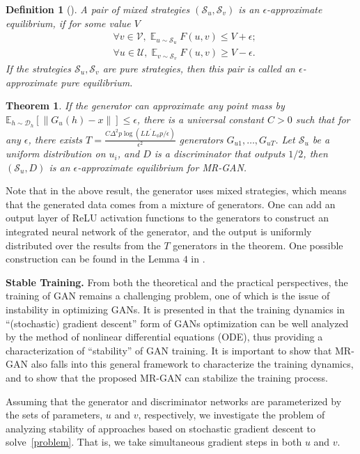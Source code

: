 \documentclass[10pt,twocolumn,letterpaper]{article}
\newcommand{\Eb}{\mathbb{E}}
\newcommand{\g}{{G_u}}
\newcommand{\U}{\mathcal{U}}
\newcommand{\D}{\mathcal{D}}
\newcommand{\V}{\mathcal{V}}
\newcommand{\E}{\mathbb{E}}
\newtheorem{thm}{Theorem}
\newtheorem{definition}{Definition}
\begin{document}
\begin{definition}[\cite{arora2017generalization}]
	A pair of mixed strategies $(\mathcal S_u,\mathcal S_v)$ is an $\epsilon$-approximate equilibrium, if for some value $V$
	\begin{align}
	&\forall v\in\V, \mathop\E_{u\sim \mathcal{S}_u}F(u,v) \le V+\epsilon;\\
	& \forall u\in\U, \mathop\E_{v\sim \mathcal{S}_v}F(u,v) \ge V-\epsilon.
	\end{align}
	If the strategies $\mathcal S_u,\mathcal{S}_v$ are pure strategies, then this pair is called an $\epsilon$-approximate pure equilibrium.
\end{definition}
\begin{thm}\label{thm_equilibrium}
	If the generator can approximate any point mass by $\Eb_{h\sim \D_h}[\|\g(h)-x\|] \le \epsilon$, there is a universal constant $C > 0$ such that for any $\epsilon$, there exists $T=\frac{C\Delta^2 p \log (LL^\prime L_\phi p/\epsilon)}{\epsilon^2}$ generators $G_{u1}, \ldots, G_{uT}$. Let $\mathcal{S}_u$ be a uniform distribution on $u_i$, and $D$ is a discriminator that outputs $1/2$, then $(\mathcal S_u, D)$ is an $\epsilon$-approximate equilibrium for MR-GAN.
\end{thm}

Note that in the above result, the generator uses mixed strategies, which means that the generated data comes from a mixture of generators. One can add an output layer of ReLU activation functions to the generators to construct an integrated neural network of the generator, and the output is uniformly distributed over the results from the $T$ generators in the theorem. One possible construction can be found in the Lemma $4$ in \cite{arora2017generalization}. 

\textbf{Stable Training.}
From both the theoretical and the practical perspectives, the training of GAN remains a challenging problem, one of which is the issue of instability in optimizing GANs. It is presented in \cite{nagarajan2017gradient} that the training dynamics in ``(stochastic) gradient descent'' form of GANs optimization can be well analyzed by the method of nonlinear differential equations (ODE), thus providing a characterization of ``stability'' of GAN training. It is important to show that MR-GAN also falls into this general framework to characterize the training dynamics, and to show that the proposed MR-GAN can stabilize the training process.

Assuming that the generator and discriminator networks are parameterized by the sets of parameters,
$u$ and $v$, respectively, we investigate the problem of analyzing stability of approaches based on stochastic gradient descent to solve~\eqref{problem}. That is, we take simultaneous gradient steps in both $u$ and $v$.
\end{document}
